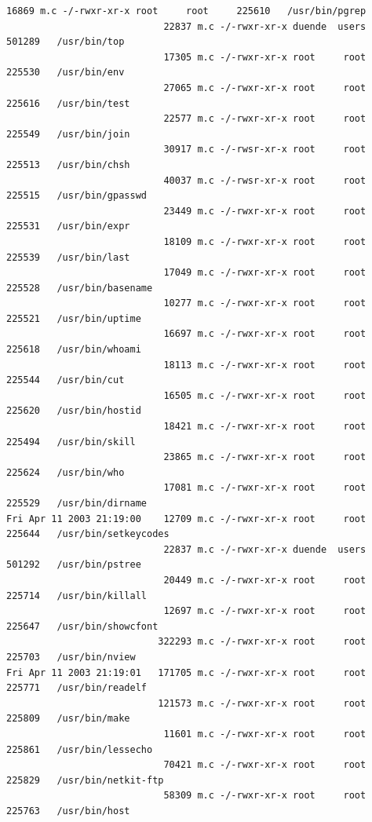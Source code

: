 {\begin{lstlisting}[style=terminal]
                            16869 m.c -/-rwxr-xr-x root     root     225610   /usr/bin/pgrep
                            22837 m.c -/-rwxr-xr-x duende  users    501289   /usr/bin/top
                            17305 m.c -/-rwxr-xr-x root     root     225530   /usr/bin/env
                            27065 m.c -/-rwxr-xr-x root     root     225616   /usr/bin/test
                            22577 m.c -/-rwxr-xr-x root     root     225549   /usr/bin/join
                            30917 m.c -/-rwsr-xr-x root     root     225513   /usr/bin/chsh
                            40037 m.c -/-rwsr-xr-x root     root     225515   /usr/bin/gpasswd
                            23449 m.c -/-rwxr-xr-x root     root     225531   /usr/bin/expr
                            18109 m.c -/-rwxr-xr-x root     root     225539   /usr/bin/last
                            17049 m.c -/-rwxr-xr-x root     root     225528   /usr/bin/basename
                            10277 m.c -/-rwxr-xr-x root     root     225521   /usr/bin/uptime
                            16697 m.c -/-rwxr-xr-x root     root     225618   /usr/bin/whoami
                            18113 m.c -/-rwxr-xr-x root     root     225544   /usr/bin/cut
                            16505 m.c -/-rwxr-xr-x root     root     225620   /usr/bin/hostid
                            18421 m.c -/-rwxr-xr-x root     root     225494   /usr/bin/skill
                            23865 m.c -/-rwxr-xr-x root     root     225624   /usr/bin/who
                            17081 m.c -/-rwxr-xr-x root     root     225529   /usr/bin/dirname
Fri Apr 11 2003 21:19:00    12709 m.c -/-rwxr-xr-x root     root     225644   /usr/bin/setkeycodes
                            22837 m.c -/-rwxr-xr-x duende  users    501292   /usr/bin/pstree
                            20449 m.c -/-rwxr-xr-x root     root     225714   /usr/bin/killall
                            12697 m.c -/-rwxr-xr-x root     root     225647   /usr/bin/showcfont
                           322293 m.c -/-rwxr-xr-x root     root     225703   /usr/bin/nview
Fri Apr 11 2003 21:19:01   171705 m.c -/-rwxr-xr-x root     root     225771   /usr/bin/readelf
                           121573 m.c -/-rwxr-xr-x root     root     225809   /usr/bin/make
                            11601 m.c -/-rwxr-xr-x root     root     225861   /usr/bin/lessecho
                            70421 m.c -/-rwxr-xr-x root     root     225829   /usr/bin/netkit-ftp
                            58309 m.c -/-rwxr-xr-x root     root     225763   /usr/bin/host
\end{lstlisting}
}


